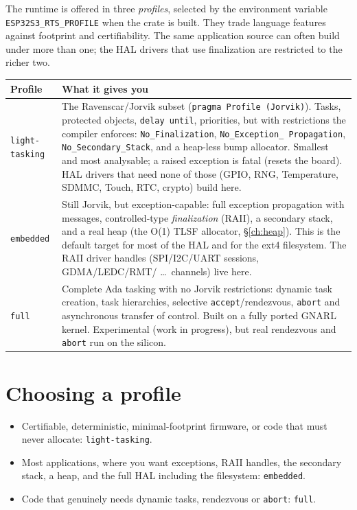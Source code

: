 The runtime is offered in three \emph{profiles}, selected by the environment
variable \texttt{ESP32S3\_RTS\_PROFILE} when the crate is built. They trade
language features against footprint and certifiability. The same application
source can often build under more than one; the HAL drivers that use finalization
are restricted to the richer two.

\begin{longtable}{p{2.6cm} p{11.3cm}}
\toprule
\textbf{Profile} & \textbf{What it gives you} \\ \midrule
\endhead
\texttt{light-tasking} &
  The Ravenscar/Jorvik subset (\texttt{pragma Profile (Jorvik)}). Tasks,
  protected objects, \texttt{delay until}, priorities, but with restrictions
  the compiler enforces: \texttt{No\_Finalization}, \texttt{No\_Exception\_%
  Propagation}, \texttt{No\_Secondary\_Stack}, and a heap-less bump allocator.
  Smallest and most analysable; a raised exception is fatal (resets the board).
  HAL drivers that need none of those (GPIO, RNG, Temperature, SDMMC, Touch,
  RTC, crypto) build here. \\
\texttt{embedded} &
  Still Jorvik, but exception-capable: full exception propagation with messages,
  controlled-type \emph{finalization} (RAII), a secondary stack, and a real
  heap (the O(1) TLSF allocator, \S\ref{ch:heap}). This is the default target for most of the HAL and for the
  ext4 filesystem. The RAII driver handles (SPI/I2C/UART sessions, GDMA/LEDC/RMT/
  \dots\ channels) live here. \\
\texttt{full} &
  Complete Ada tasking with no Jorvik restrictions: dynamic task creation, task
  hierarchies, selective \texttt{accept}/rendezvous, \texttt{abort} and
  asynchronous transfer of control. Built on a fully ported GNARL kernel.
  Experimental (work in progress), but real rendezvous and \texttt{abort} run on
  the silicon. \\
\bottomrule
\end{longtable}

\section{Choosing a profile}

\begin{itemize}
\item Certifiable, deterministic, minimal-footprint firmware, or code that must
  never allocate: \texttt{light-tasking}.
\item Most applications, where you want exceptions, RAII handles, the secondary
  stack, a heap, and the full HAL including the filesystem: \texttt{embedded}.
\item Code that genuinely needs dynamic tasks, rendezvous or \texttt{abort}:
  \texttt{full}.
\end{itemize}

